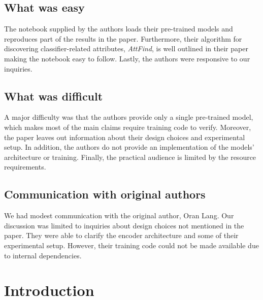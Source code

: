\subsection*{What was easy}

The notebook supplied by the authors loads their pre-trained models and reproduces part of the results in the paper. Furthermore, their algorithm for discovering classifier-related attributes, \textit{AttFind}, is well outlined in their paper making the notebook easy to follow. Lastly, the authors were responsive to our inquiries.

\subsection*{What was difficult}

A major difficulty was that the authors provide only a single pre-trained model, which makes most of the main claims require training code to verify. Moreover, the paper leaves out information about their design choices and experimental setup. In addition, the authors do not provide an implementation of the models' architecture or training. Finally, the practical audience is limited by the resource requirements.

\subsection*{Communication with original authors}

We had modest communication with the original author, Oran Lang. Our discussion was limited to inquiries about design choices not mentioned in the paper. They were able to clarify the encoder architecture and some of their experimental setup. However, their training code could not be made available due to internal dependencies.

\newpage

\section{Introduction}

